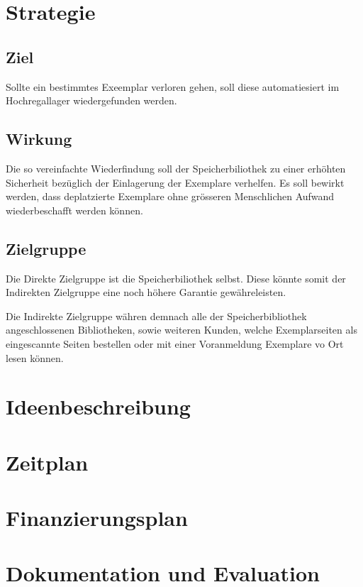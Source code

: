 \chapter{Strategie}

\section{Ziel}
Sollte ein bestimmtes Exeemplar verloren gehen, soll diese automatiesiert im Hochregallager wiedergefunden werden.

\section{Wirkung}
Die so vereinfachte Wiederfindung soll der Speicherbiliothek zu einer erhöhten Sicherheit bezüglich der Einlagerung der Exemplare verhelfen. Es soll bewirkt werden, dass deplatzierte Exemplare ohne grösseren Menschlichen Aufwand wiederbeschafft werden können.

\section{Zielgruppe}
Die Direkte Zielgruppe ist die Speicherbiliothek selbst. Diese könnte somit der Indirekten Zielgruppe eine noch höhere Garantie gewähreleisten.

Die Indirekte Zielgruppe währen demnach alle der Speicherbibliothek angeschlossenen Bibliotheken, sowie weiteren Kunden, welche Exemplarseiten als eingescannte Seiten bestellen oder mit einer Voranmeldung Exemplare vo Ort lesen können.

\chapter{Ideenbeschreibung}

\chapter{Zeitplan}

\chapter{Finanzierungsplan}

\chapter{Dokumentation und Evaluation}